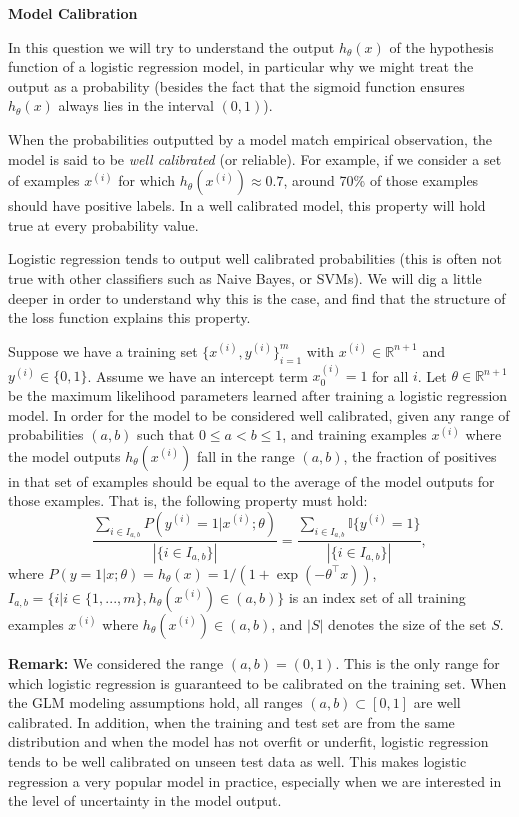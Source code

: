 \clearpage
\item {} {\bf Model Calibration}

In this question we will try to understand the output $h_\theta(x)$ of the
hypothesis function of a logistic regression model, in particular why we might
treat the output as a probability (besides the fact that the sigmoid function
ensures $h_\theta(x)$ always lies in the interval $(0, 1)$).

When the probabilities outputted by a model match empirical observation, the
model is said to be \emph{well calibrated} (or reliable). For example, if we
consider a set of examples $x^{(i)}$ for which $h_\theta(x^{(i)})  \approx
0.7$, around 70\% of those examples should have positive labels. In a
well calibrated model, this property will hold true at every probability value.

Logistic regression tends to output well calibrated probabilities (this is
often not true with other classifiers such as Naive Bayes, or SVMs). We will
dig a little deeper in order to understand why this is the case, and find that
the structure of the loss function explains this property.

Suppose we have a training set $\{x^{(i)},y^{(i)}\}_{i=1}^m$ with
$x^{(i)} \in \mathbb{R}^{n+1}$ and $y^{(i)} \in \{0, 1\}$. Assume we have an
intercept term $x_0^{(i)} = 1$ for all $i$. Let $\theta \in \mathbb{R}^{n+1}$
be the maximum likelihood parameters learned after training a logistic
regression model. In order for the model to be considered well calibrated,
given any range of probabilities $(a, b)$ such that $0 \le a < b \le 1$, and
training examples $x^{(i)}$ where the model outputs $h_\theta(x^{(i)})$ fall in
the range $(a, b)$, the fraction of positives in that set of examples should be
equal to the average of the model outputs for those examples. That is, the
following property must hold:
$$
  \frac{\sum_{i\in I_{a,b}}  P\left(y^{(i)}=1|x^{(i)};\theta\right)}
       {{|\{i\in I_{a,b}\}|}}
  = \frac{\sum_{i\in I_{a,b}} \mathbb{I}\{y^{(i)} = 1\}}
         {|\{i\in I_{a,b}\}|},
$$
where $P(y=1|x;\theta) = h_\theta(x) = 1/(1+\exp(-\theta^\top x))$, $I_{a,b} =
\{ i | i \in \{1,...,m\},  h_\theta(x^{(i)}) \in (a,b)\} $ is an index set of
all training examples $x^{(i)}$ where $h_\theta(x^{(i)}) \in (a,b)$, and $|S|$
denotes the size of the set $S$.

\begin{enumerate}
  
  
  
\end{enumerate}

\textbf{Remark:}  We considered the range $(a,b) = (0, 1)$. This is the only
range for which logistic regression is guaranteed to be calibrated on the
training set. When the GLM modeling assumptions hold, all ranges $(a,b) \subset
[0,1]$ are well calibrated. In addition, when the training and test set are
from the same distribution and when the model has not overfit or underfit,
logistic regression tends to be well calibrated on unseen test data as well.
This makes logistic regression a very popular model in practice, especially
when we are interested in the level of uncertainty in the model output.
